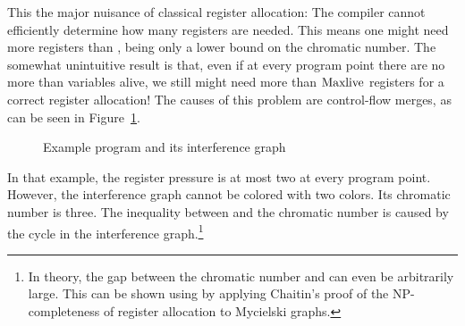 {This the major nuisance of classical register allocation:
The compiler cannot efficiently determine how many registers are needed.
This means one might need more registers than \maxlive,
\maxlive being only a lower bound on the chromatic number.
The somewhat unintuitive result is that, even if at every program point there are no more than 
\maxlive variables alive, we still might need more than $\mathrm{Maxlive}$ registers for a correct register allocation!
The causes of this problem are control-flow merges, %
as can be seen in Figure~\ref{fig:ra:exprg}.

\begin{figure}[htbp]
	\begin{center}
		\qquad
	\end{center}
	\caption{Example program and its interference graph}
	\label{fig:ra:exprg}
\end{figure}

In that example, the register pressure is at most two at every program point.
However, the interference graph cannot be colored with two colors. 
Its chromatic number is three.
The inequality between \maxlive and the chromatic number is caused by the cycle 
in the interference graph.\footnote{In theory, the gap between the chromatic number and \maxlive can even be arbitrarily large. This can be shown using by applying Chaitin's proof of the NP-completeness of register allocation to Mycielski graphs.}

}
